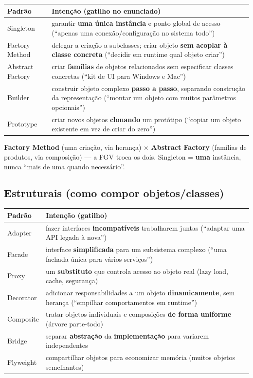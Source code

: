 \begin{center}
\begin{tabular}{@{}p{2.8cm}p{9cm}@{}}
\toprule
\textbf{Padrão} & \textbf{Intenção (gatilho no enunciado)} \\
\midrule
Singleton & garantir \textbf{uma única instância} e ponto global de acesso (``apenas uma conexão/configuração no sistema todo'') \\
Factory Method & delegar a criação a subclasses; criar objeto \textbf{sem acoplar à classe concreta} (``decidir em runtime qual objeto criar'') \\
Abstract Factory & criar \textbf{famílias} de objetos relacionados sem especificar classes concretas (``kit de UI para Windows e Mac'') \\
Builder & construir objeto complexo \textbf{passo a passo}, separando construção da representação (``montar um objeto com muitos parâmetros opcionais'') \\
Prototype & criar novos objetos \textbf{clonando} um protótipo (``copiar um objeto existente em vez de criar do zero'') \\
\bottomrule
\end{tabular}
\end{center}

\begin{pegadinha}
\textbf{Factory Method} (uma criação, via herança) $\times$ \textbf{Abstract
Factory} (famílias de produtos, via composição) --- a FGV troca os dois.
Singleton = \textbf{uma} instância, nunca ``mais de uma quando necessário''.
\end{pegadinha}

\subsection{Estruturais (como compor objetos/classes)}

\begin{center}
\begin{tabular}{@{}p{2.8cm}p{9cm}@{}}
\toprule
\textbf{Padrão} & \textbf{Intenção (gatilho)} \\
\midrule
Adapter & fazer interfaces \textbf{incompatíveis} trabalharem juntas (``adaptar uma API legada à nova'') \\
Facade & interface \textbf{simplificada} para um subsistema complexo (``uma fachada única para vários serviços'') \\
Proxy & um \textbf{substituto} que controla acesso ao objeto real (lazy load, cache, segurança) \\
Decorator & adicionar responsabilidades a um objeto \textbf{dinamicamente}, sem herança (``empilhar comportamentos em runtime'') \\
Composite & tratar objetos individuais e composições \textbf{de forma uniforme} (árvore parte-todo) \\
Bridge & separar \textbf{abstração} da \textbf{implementação} para variarem independentes \\
Flyweight & compartilhar objetos para economizar memória (muitos objetos semelhantes) \\
\bottomrule
\end{tabular}
\end{center}

